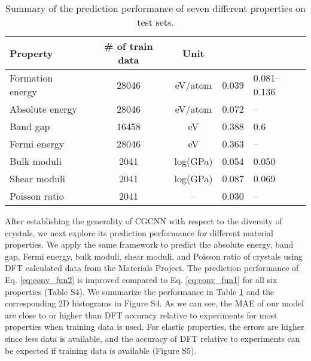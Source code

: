 \documentclass[twocolumn, prl]{revtex4-1}
\begin{document}
\begin{table}\caption{Summary of the prediction performance of seven different properties on test sets.\label{tab:predictions}}
\begin{ruledtabular}
\begin{tabular}{p{2cm}cccp{1.8cm}}
  Property    & \# of train data		&	Unit   &    & \\
  \hline
  Formation energy & 28046    		&  eV/atom  & 0.039 					&	0.081--0.136\cite{kirklin2015open} \\
  Absolute energy	& 28046			&  eV/atom	& 0.072					&	--\\
  Band gap			& 16458			&  eV		& 0.388					&	0.6\cite{jain2011high}\\
  Fermi energy		& 28046			&  eV		& 0.363					&	--\\
  Bulk moduli		& 2041 			&  log(GPa)	& 0.054					&	0.050\cite{de2015charting}\\
  Shear moduli		& 2041			& log(GPa)	& 0.087					&	0.069\cite{de2015charting}\\
  Poisson ratio		& 2041			& --			& 0.030					&	--\\

\end{tabular}
\end{ruledtabular}
\end{table}


After establishing the generality of CGCNN with respect to the diversity of crystals, we next explore its prediction performance for different material properties. We apply the same framework to predict the absolute energy, band gap, Fermi energy, bulk moduli, shear moduli, and Poisson ratio of crystals using DFT calculated data from the Materials Project\cite{jain2013commentary}. The prediction performance of Eq. \ref{eq:conv_fun2} is improved compared to Eq. \ref{eq:conv_fun1} for all six properties (Table S4). We summarize the performance in Table \ref{tab:predictions} and the corresponding 2D histograms in Figure S4. As we can see, the MAE of our model are close to or higher than DFT accuracy relative to experiments for most properties when  training data is used. For elastic properties, the errors are higher since less data is available, and the accuracy of DFT relative to experiments can be expected if  training data is available (Figure S5). 
\end{document}
